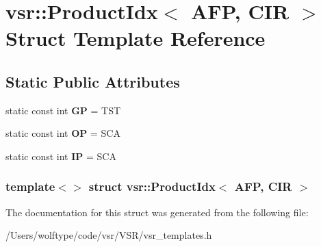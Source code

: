 \hypertarget{structvsr_1_1_product_idx_3_01_a_f_p_00_01_c_i_r_01_4}{\section{vsr\-:\-:Product\-Idx$<$ A\-F\-P, C\-I\-R $>$ Struct Template Reference}
\label{structvsr_1_1_product_idx_3_01_a_f_p_00_01_c_i_r_01_4}
}
\subsection*{Static Public Attributes}
\begin{DoxyCompactItemize}
\item 
\hypertarget{structvsr_1_1_product_idx_3_01_a_f_p_00_01_c_i_r_01_4_a98ee526d49192a0ebc9410f6b5fa12b8}{static const int {\bfseries G\-P} = T\-S\-T}\label{structvsr_1_1_product_idx_3_01_a_f_p_00_01_c_i_r_01_4_a98ee526d49192a0ebc9410f6b5fa12b8}

\item 
\hypertarget{structvsr_1_1_product_idx_3_01_a_f_p_00_01_c_i_r_01_4_afd27b60e3ced701913599b8ef6dc1d84}{static const int {\bfseries O\-P} = S\-C\-A}\label{structvsr_1_1_product_idx_3_01_a_f_p_00_01_c_i_r_01_4_afd27b60e3ced701913599b8ef6dc1d84}

\item 
\hypertarget{structvsr_1_1_product_idx_3_01_a_f_p_00_01_c_i_r_01_4_a1866391ae2f54daa148085f46c6869e2}{static const int {\bfseries I\-P} = S\-C\-A}\label{structvsr_1_1_product_idx_3_01_a_f_p_00_01_c_i_r_01_4_a1866391ae2f54daa148085f46c6869e2}

\end{DoxyCompactItemize}
\subsubsection*{template$<$$>$ struct vsr\-::\-Product\-Idx$<$ A\-F\-P, C\-I\-R $>$}



The documentation for this struct was generated from the following file\-:\begin{DoxyCompactItemize}
\item 
/\-Users/wolftype/code/vsr/\-V\-S\-R/vsr\-\_\-templates.\-h\end{DoxyCompactItemize}
